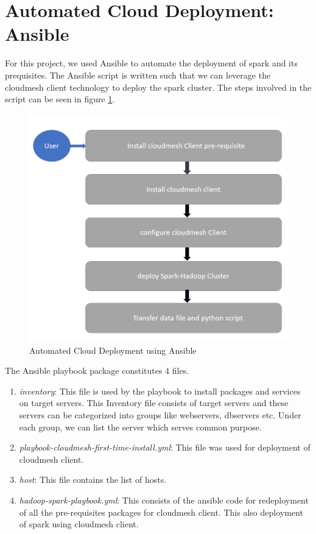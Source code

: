 \documentclass[9pt,twocolumn,twoside]{../../styles/osajnl}
\begin{document}
\section{Automated Cloud Deployment: Ansible}
For this project, we used Ansible to automate the deployment of spark and its prequisites. The Ansible script is written such that we can leverage the cloudmesh client technology to deploy the spark cluster. The steps involved in the script can be seen in figure \ref{fig:ansible}.

\begin{figure}[h]
\centering
\includegraphics[scale = 0.28]{images/auto_deploy}
\caption{Automated Cloud Deployment using Ansible}
\label{fig:ansible}
\end{figure}


The Ansible playbook package constitutes 4 files.
\begin{enumerate}
\item \textit{inventory}: This file is used by the playbook to install packages and services on target servers. This Inventory file consists of target servers and these servers can be categorized into groups like webservers, dbservers etc. Under each group, we can list the server which serves common purpose.
\item \textit{playbook-cloudmesh-first-time-install.yml}: This file was used for deployment of cloudmesh client.
\item \textit{host}: This file contains the list of hosts.
\item \textit{hadoop-spark-playbook.yml}: This consists of the ansible code for redeployment of all the pre-requisites packages for cloudmesh client. This also deployment of spark using cloudmesh client.
\end{enumerate}
\end{document}
